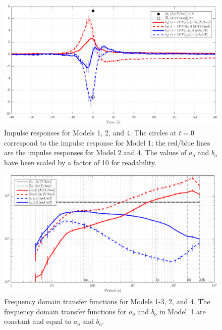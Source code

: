\documentclass[draft,linenumbers]{agujournal2018}
\begin{document}
\begin{figure}[h]
\centering
\includegraphics[width=\textwidth]{figures/plot_model_summary_H-options-1.pdf}
\caption{Impulse responses for Models 1, 2, and 4. The circles at $t = 0$ correspond to the impulse response for Model 1; the red/blue lines are the impulse responses for Model 2 and 4. The values of $a_o$ and $b_o$ have been scaled by a factor of 10 for readability.}
\label{H}
\end{figure}

\begin{figure}[h]
\centering
\includegraphics[width=\textwidth]{figures/plot_model_summary_Z-options-1.pdf}
\caption{Frequency domain transfer functions for Models 1-3, 2, and 4. The frequency domain transfer functions for $a_o$ and $b_o$ in Model~1 are constant and equal to $a_o$ and $b_o$.}
\label{Z}
\end{figure}
\end{document}
